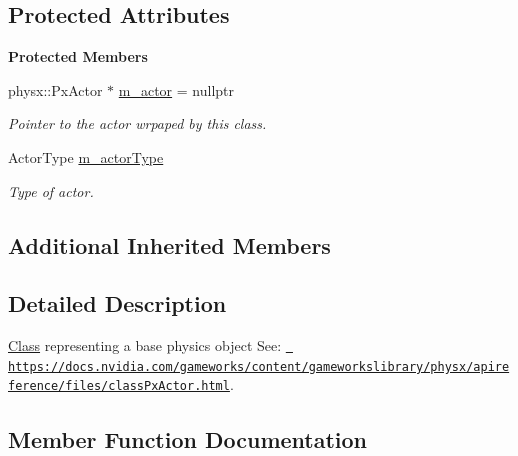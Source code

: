 \subsection*{Protected Attributes}
\begin{Indent}\textbf{ Protected Members}\par
\begin{DoxyCompactItemize}
\item 
\mbox{\label{classrev_1_1_physics_actor_ae04430a104433e272f28c7de00e372b3}} 
physx\+::\+Px\+Actor $\ast$ \mbox{\hyperlink{classrev_1_1_physics_actor_ae04430a104433e272f28c7de00e372b3}{m\+\_\+actor}} = nullptr
\begin{DoxyCompactList}\small\item\em Pointer to the actor wrpaped by this class. \end{DoxyCompactList}\item 
\mbox{\label{classrev_1_1_physics_actor_ac675c383b24ad585fc3230185a28d5a9}} 
Actor\+Type \mbox{\hyperlink{classrev_1_1_physics_actor_ac675c383b24ad585fc3230185a28d5a9}{m\+\_\+actor\+Type}}
\begin{DoxyCompactList}\small\item\em Type of actor. \end{DoxyCompactList}\end{DoxyCompactItemize}
\end{Indent}
\subsection*{Additional Inherited Members}


\subsection{Detailed Description}
\mbox{\hyperlink{struct_class}{Class}} representing a base physics object See\+: \href{https://docs.nvidia.com/gameworks/content/gameworkslibrary/physx/apireference/files/classPxActor.html}{\texttt{ https\+://docs.\+nvidia.\+com/gameworks/content/gameworkslibrary/physx/apireference/files/class\+Px\+Actor.\+html}}. 

\subsection{Member Function Documentation}
\mbox{\label{classrev_1_1_physics_actor_a5bc3e96948718546204f3201971e1914}} 
